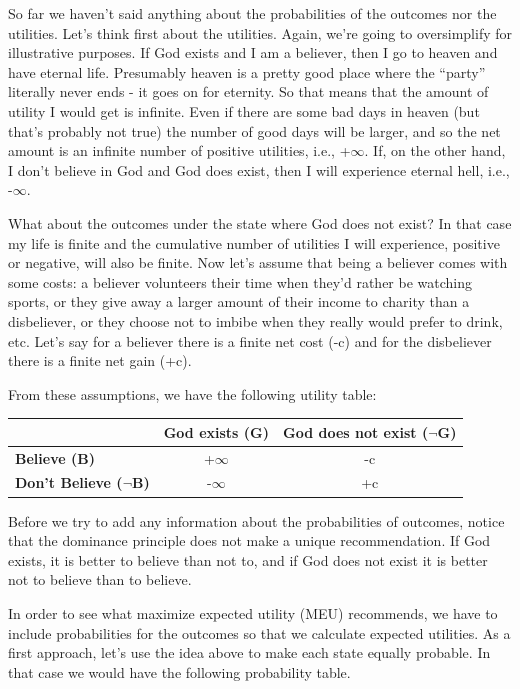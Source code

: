 \documentclass[]{tufte-book}
\begin{document}
So far we haven't said anything about the probabilities of the outcomes nor the utilities. Let's think first about the utilities. Again, we're going to oversimplify for illustrative purposes. If God exists and I am a believer, then I go to heaven and have eternal life. Presumably heaven is a pretty good place where the ``party'' literally never ends - it goes on for eternity. So that means that the amount of utility I would get is infinite. Even if there are some bad days in heaven (but that's probably not true) the number of good days will be larger, and so the net amount is an infinite number of positive utilities, i.e., +\(\infty\). If, on the other hand, I don't believe in God and God does exist, then I will experience eternal hell, i.e., -\(\infty\).

What about the outcomes under the state where God does not exist? In that case my life is finite and the cumulative number of utilities I will experience, positive or negative, will also be finite. Now let's assume that being a believer comes with some costs: a believer volunteers their time when they'd rather be watching sports, or they give away a larger amount of their income to charity than a disbeliever, or they choose not to imbibe when they really would prefer to drink, etc. Let's say for a believer there is a finite net cost (-c) and for the disbeliever there is a finite net gain (+c).

From these assumptions, we have the following utility table:

\begin{longtable}[]{@{}lcc@{}}
\toprule
& God exists (G) & God does not exist (\(\neg\)G)\tabularnewline
\midrule
\endhead
\textbf{Believe (B)} & +\(\infty\) & -c\tabularnewline
\textbf{Don't Believe (\(\neg\)B)} & -\(\infty\) & +c\tabularnewline
\bottomrule
\end{longtable}

Before we try to add any information about the probabilities of outcomes, notice that the dominance principle does not make a unique recommendation. If God exists, it is better to believe than not to, and if God does not exist it is better not to believe than to believe.

In order to see what maximize expected utility (MEU) recommends, we have to include probabilities for the outcomes so that we calculate expected utilities. As a first approach, let's use the idea above to make each state equally probable. In that case we would have the following probability table.
\end{document}
